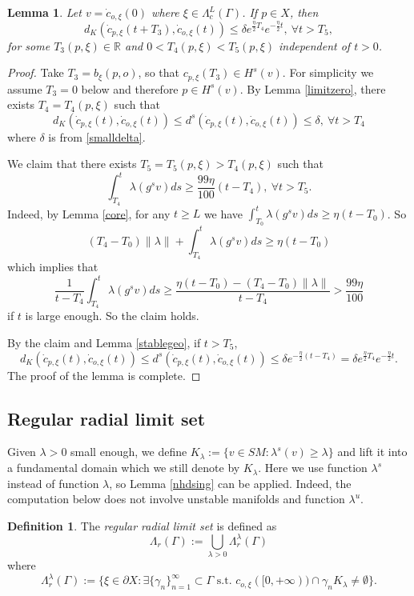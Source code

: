 \documentclass[11pt]{amsart}
\newtheorem{lemma}[theorem]{Lemma}
\theoremstyle{definition}
\newtheorem{definition}[theorem]{Definition}
\def\pX{{\partial X}}
\def\RR{{\mathbb R}}
\def\c{\gamma}   \def\C{\Gamma}
\def\d{\delta}   %
\def\l{\lambda}   \def\L{\Lambda}
\begin{document}
\begin{lemma}\label{decay}
Let $v=\dot{c}_{o,\xi}(0)$ where $\xi\in \L_c^L(\C)$. If $p\in X$, then 
$$d_K(\dot c_{p,\xi}(t+T_3), \dot c_{o,\xi}(t))\le \d e^{\frac{\eta}{2}T_4}e^{-\frac{\eta}{2}t}, \ \forall t>T_5,$$
for some $T_3(p,\xi)\in \RR$ and $0<T_4(p,\xi) <T_5(p,\xi)$ independent of $t>0$.
\end{lemma}
\begin{proof}
Take $T_3=b_\xi(p,o)$, so that $c_{p,\xi}(T_3)\in H^s(v)$. For simplicity we assume $T_3=0$ below and therefore $p\in H^s(v)$. By Lemma \ref{limitzero}, there exists $T_4=T_4(p,\xi)$ such that 
$$d_K(\dot c_{p,\xi}(t), \dot c_{o,\xi}(t))\le d^s(\dot c_{p,\xi}(t), \dot c_{o,\xi}(t))\le  \d, \ \forall t>T_4$$
where $\d$ is from \eqref{smalldelta}.

We claim that there exists $T_5=T_5(p,\xi)>T_4(p,\xi)$ such that
$$\int_{T_4}^t\lambda(g^sv)ds \ge \frac{99\eta}{100}(t-T_4),\ \forall t>T_5.$$ 
Indeed, by Lemma \ref{core}, for any $t\ge L$ we have $\int_{T_0}^t\lambda(g^sv)ds \ge \eta(t-T_0)$. So 
$$(T_4-T_0)\|\lambda\|+\int_{T_4}^t\lambda(g^sv)ds\ge  \eta(t-T_0)$$
which implies that
$$\frac{1}{t-T_4}\int_{T_4}^t\lambda(g^sv)ds\ge \frac{\eta(t-T_0)-(T_4-T_0)\|\lambda\|}{t-T_4}> \frac{99\eta}{100}$$
if $t$ is large enough. So the claim holds.

By the claim and Lemma \ref{stablegeo}, if $t>T_5$,
$$d_K(\dot c_{p,\xi}(t), \dot c_{o,\xi}(t))\le d^s(\dot c_{p,\xi}(t), \dot c_{o,\xi}(t))\le \d e^{-\frac{\eta}{2}(t-T_4)}=\d e^{\frac{\eta}{2}T_4}e^{-\frac{\eta}{2}t}.$$
The proof of the lemma is complete.
\end{proof}

\subsection{Regular radial limit set}
Given $\l>0$ small enough, we define $K_\l:=\{v\in SM: \l^s(v)\ge \l\}$ and lift it into a fundamental domain which we still denote by $K_\l$. Here we use function $\l^s$ instead of function $\l$, so Lemma \ref{nhdsing} can be applied. Indeed, the computation below does not involve unstable manifolds and function $\l^u$. 
\begin{definition}
The \emph{regular radial limit set} is defined as 
$$\L_{r}(\C):=\bigcup_{\l>0}\L_r^\l(\C)$$
where
\[\L_r^\l(\C):=\{\xi\in \pX: \exists \{\c_n\}_{n=1}^\infty\subset \C \text{\ s.t.\ }c_{o,\xi}([0,+\infty))\cap \c_n K_\l\neq \emptyset\}.\]
\end{definition}
\end{document}
